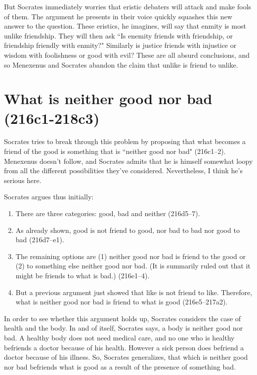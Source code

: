 \documentclass[11pt]{article}
\begin{document}
But Socrates immediately worries that eristic debaters will attack and make fools of them.  The argument he presents in their voice quickly squashes this new answer to the question.  These eristics, he imagines, will say that enmity is most unlike friendship.  They will then ask ``Is enemity friends with friendship, or friendship friendly with enmity?"  Similarly is justice friends with injustice or wisdom with foolishness or good with evil?  These are all absurd conclusions, and so Menexenus and Socrates abandon the claim that unlike is friend to unlike.

\section{What is neither good nor bad (216c1-218c3)}

Socrates tries to break through this problem by proposing that what becomes a friend of the good is something that is ``neither good nor bad" (216c1--2).  Menexenus doesn't follow, and Socrates admits that he is himself somewhat loopy from all the different possibilities they've considered.  Nevertheless, I think he's serious here.

Socrates argues thus initially:

\begin{enumerate}
    \item There are three categories: good, bad and neither (216d5--7).
    \item As already shown, good is not friend to good, nor bad to bad nor good to bad (216d7--e1).
    \item The remaining options are (1) neither good nor bad is friend to the good or (2) to something else neither good nor bad.  (It is summarily ruled out that it might be friends to what is bad.) (216e1--4).
    \item But a previous argument just showed that like is not friend to like.  Therefore, what is neither good nor bad is friend to what is good (216e5--217a2).
\end{enumerate}

In order to see whether this argument holds up, Socrates considers the case of health and the body.  In and of itself, Socrates says, a body is neither good nor bad.  A healthy body does not need medical care, and no one who is healthy befriends a doctor because of his health.  However a sick person does befriend a doctor because of his illness.  So, Socrates generalizes, that which is neither good nor bad befriends what is good as a result of the presence of something bad.
\end{document}

